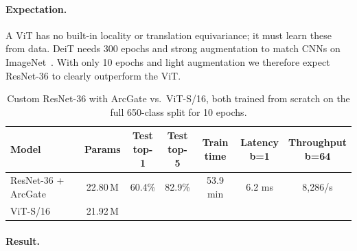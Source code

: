 \paragraph{Expectation.}
A ViT has no built-in locality or translation equivariance; it must learn these from data.
DeiT needs 300 epochs and strong augmentation to match CNNs on ImageNet~\cite{touvron2021deit}.
With only 10 epochs and light augmentation we therefore expect ResNet-36 to clearly outperform the ViT.

\begin{table}[t]
  \centering
  \small
  \setlength{\tabcolsep}{8pt}
  \begin{tabular}{@{}lcccccc@{}}
    \toprule
    Model & Params & \makecell{Test\\top-1} & \makecell{Test\\top-5} & \makecell{Train\\time} & \makecell{Latency\\b=1} & \makecell{Throughput\\b=64} \\
    \midrule
    ResNet-36 + ArcGate & 22.80\,M & 60.4\% & 82.9\% & 53.9 min & 6.2 ms & 8{,}286/s \\
    ViT-S/16 & 21.92\,M & \todo{--} & \todo{--} & \todo{--} & \todo{--} & \todo{--} \\
    \bottomrule
  \end{tabular}
  \caption{Custom ResNet-36 with ArcGate vs.\ ViT-S/16, both trained from scratch on the full 650-class split for 10 epochs. }
  \label{tab:p3-vit}
\end{table}

\paragraph{Result.}

